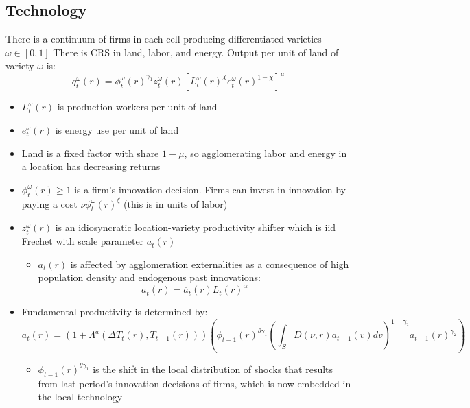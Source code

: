 \documentclass[12pt]{amsart}
\begin{document}
\subsection{Technology}

There is a continuum of firms in each cell producing differentiated varieties $\omega \in [0,1]$ There is CRS in land, labor, and energy. Output per unit of land of variety $\omega$ is:
\begin{equation}
    q_t^\omega(r) = {\phi_t^\omega(r)}^{\gamma_1} z_t^\omega(r) [{L_t^\omega(r)}^{\chi} {e_t^\omega(r)}^{1-\chi}]^\mu \label{eq:technology}
\end{equation}
\begin{itemize}
    \item $L_t^\omega(r)$ is production workers per unit of land
    \item $e_t^\omega(r)$ is energy use per unit of land
    \item Land is a fixed factor with share $1-\mu$, so agglomerating labor and energy in a location has decreasing returns 
    \item $\phi_t^\omega(r) \geq 1 $ is a firm's innovation decision. Firms can invest in innovation by paying a cost $\nu \phi_t^\omega(r)^{\xi}$ (this is in units of labor)
    \item $z_t^\omega(r)$ is an idiosyncratic location-variety productivity shifter which is iid Frechet with scale parameter $a_t(r)$
    \begin{itemize}
        \item $a_t(r)$ is affected by agglomeration externalities as a consequence of high population density and endogenous past innovations:
        \begin{equation}
            a_t(r) = \overline{a}_t(r) L_t(r)^\alpha \label{eq:productivity}
        \end{equation}
    \end{itemize}
    \item Fundamental productivity is determined by:
        \begin{equation}
            \overline{a}_t(r) = \left( 1 + \Lambda^a(\Delta T_t(r), T_{t-1}(r)) \right) \left( \phi_{t-1}(r)^{\theta \gamma_1} \left(\int_S D(\nu,r) \overline{a}_{t-1}(v) dv \right)^{1-\gamma_2} \overline{a}_{t-1}(r)^{\gamma_2} \right) \label{eq:fundamental_productivity}
        \end{equation}
    \begin{itemize}
        \item $\phi_{t-1}(r)^{\theta \gamma_1}$  is the shift in the local distribution of shocks that results from last period's innovation decisions of firms, which is now embedded in the local technology

\end{itemize}
\end{itemize}
\end{document}
